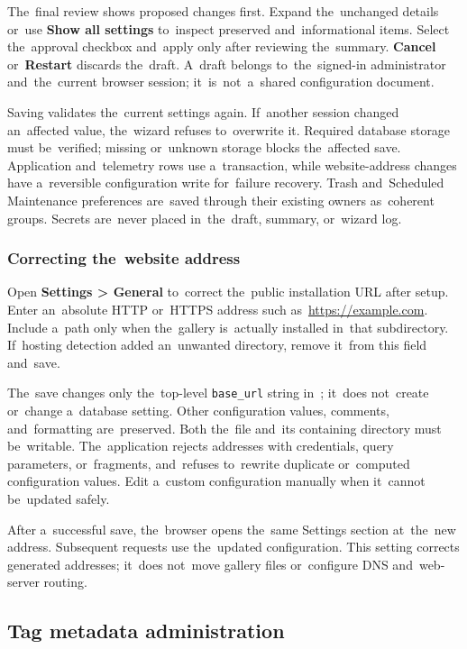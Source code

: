 \documentclass[11pt,a4paper]{article}
\newcommand{\filepath}[1]{\path{#1}}
\newcommand{\ui}[1]{\textbf{#1}}
\newcommand{\codeword}[1]{\nolinkurl{#1}}
\begin{document}
The~final review shows proposed changes first. Expand the~unchanged details
or~use \ui{Show all settings} to~inspect preserved and~informational items.
Select the~approval checkbox and~apply only after reviewing the~summary.
\ui{Cancel} or~\ui{Restart} discards the~draft. A~draft belongs to~the~signed-in
administrator and~the~current browser session; it~is~not~a~shared configuration
document.

Saving validates the~current settings again. If~another session changed
an~affected value, the~wizard refuses to~overwrite it. Required database storage
must be~verified; missing or~unknown storage blocks the~affected save.
Application and~telemetry rows use a~transaction, while website-address changes
have a~reversible configuration write for~failure recovery. Trash and~Scheduled
Maintenance preferences are~saved through their existing owners as~coherent
groups. Secrets are~never placed in~the~draft, summary, or~wizard log.

\subsubsection{Correcting the~website address}

Open \ui{Settings > General} to~correct the~public installation URL after setup.
Enter an~absolute HTTP or~HTTPS address such as~\url{https://example.com}.
Include a~path only when the~gallery is~actually installed in~that subdirectory.
If~hosting detection added an~unwanted directory, remove it~from this field
and~save.

The~save changes only the~top-level \codeword{base_url} string
in~\filepath{config.php}; it~does not~create or~change a~database setting. Other
configuration values, comments, and~formatting are~preserved. Both the~file
and~its containing directory must be~writable. The~application rejects addresses
with credentials, query parameters, or~fragments, and~refuses to~rewrite
duplicate or~computed configuration values. Edit a~custom configuration manually
when it~cannot be~updated safely.

After a~successful save, the~browser opens the~same Settings section at~the~new
address. Subsequent requests use the~updated configuration. This setting
corrects generated addresses; it~does not~move gallery files or~configure DNS
and~web-server routing.

\subsection{Tag metadata administration}
\end{document}
